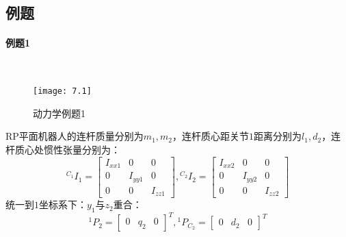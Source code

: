 \documentclass[
12pt, %
a4paper, 
oneside, %
headinclude,footinclude, %
]{scrartcl}
\begin{document}
\subsection[例题]{例题}
{\footnotesize
\paragraph{例题1}~\\
\begin{minipage}{0.3\textwidth}
\begin{figure}[H]
\centering 
\texttt{[image: 7.1]} 
\caption{动力学例题1}
\end{figure}
\end{minipage}
\begin{minipage}{0.7\textwidth}
\hspace{2em}
RP平面机器人的连杆质量分别为$ m_1, m_2 $，连杆质心距关节$ 1 $距离分别为$ l_1, d_2 $，连杆质心处惯性张量分别为：
$$ {{}^{C_1}}I_1 = \begin{bmatrix} I_{xx1} & 0 & 0 \\ 0 & I_{yy1} & 0 \\ 0 & 0 & I_{zz1} \end{bmatrix}, {{}^{C_2}}I_2 = \begin{bmatrix} I_{xx2} & 0 & 0 \\ 0 & I_{yy2} & 0 \\ 0 & 0 & I_{zz2} \end{bmatrix} $$
\hspace{2em}
统一到$ 1 $坐标系下：$ y_1 $与$ z_2 $重合：
$$ {}^1 P_2 = \begin{bmatrix} 0 & q_2 & 0 \end{bmatrix}^T, {}^1 P_{C_2} = \begin{bmatrix} 0 & d_2 & 0 \end{bmatrix}^T $$
\end{minipage}
}
\end{document}
